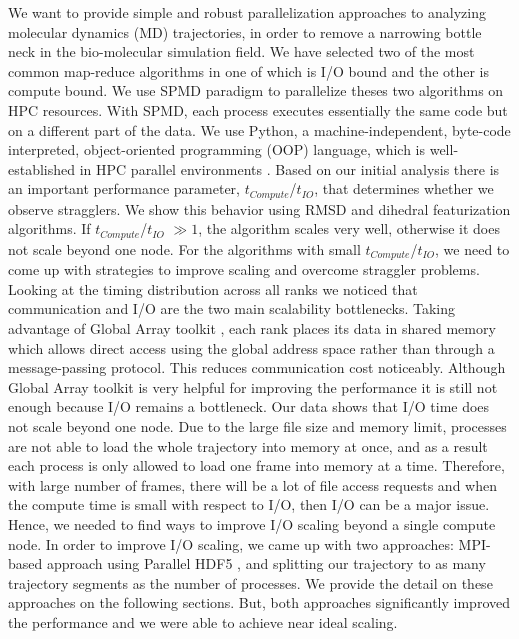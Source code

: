 We want to provide simple and robust parallelization approaches to analyzing molecular dynamics (MD) trajectories, in order to remove a narrowing bottle neck in the bio-molecular simulation field. 
We have selected two of the most common map-reduce algorithms in  one of which is I/O bound and the other is compute bound.
We use SPMD paradigm to parallelize theses two algorithms on HPC resources.
With SPMD, each process executes essentially the same code but on a different part of the data. 
We use Python, a machine-independent, byte-code interpreted, object-oriented programming (OOP) language, which is well-established in HPC parallel environments \cite{GAiN}. 
Based on our initial analysis there is an important performance parameter,  $t_{Compute}$/$t_{IO}$, that determines whether we observe stragglers.
We show this behavior using RMSD and dihedral featurization algorithms.
If $t_{Compute}$/$t_{IO}$  $\gg 1$, the algorithm scales very well, otherwise it does not scale beyond one node. 
For the algorithms with small $t_{Compute}$/$t_{IO}$, we need to come up with strategies to improve scaling and overcome straggler problems.
Looking at the timing distribution across all ranks we noticed that communication and I/O are the two main scalability bottlenecks.
Taking advantage of Global Array toolkit \cite{GA}, each rank places its data in shared memory which allows direct access using the global address space rather than through a message-passing protocol. 
This reduces communication cost noticeably.
Although Global Array toolkit is very helpful for improving the performance it is still not enough because I/O remains a bottleneck.
Our data shows that I/O time does not scale beyond one node. 
Due to the large file size and memory limit, processes are not able to load the whole trajectory into memory at once, and as a result each process is only allowed to load one frame into memory at a time.
Therefore, with large number of frames, there will be a lot of file access requests and when the compute time is small with respect to I/O, then I/O can be a major issue.
Hence, we needed to find ways to improve I/O scaling beyond a single compute node.
In order to improve I/O scaling, we came up with two approaches: MPI-based approach using Parallel HDF5 \cite{pythonhdf5}, and splitting our trajectory to as many trajectory segments as the number of processes. 
We provide the detail on these approaches on the following sections.
But, both approaches significantly improved the performance and we were able to achieve near ideal scaling.